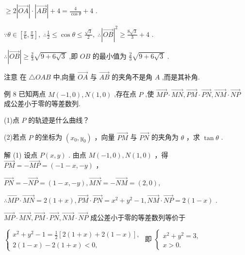 \documentclass[10pt]{article}
\begin{document}
\(\geq  2\left| \overrightarrow{OA}\right|  \cdot  \left| \overrightarrow{AB}\right|  + 4 = \frac{4}{\cos \theta } + 4\) .

\(\because \theta  \in  \left\lbrack  {\frac{\pi }{6},\frac{\pi }{3}}\right\rbrack  ,\;\therefore \frac{1}{2} \leq  \cos \theta  \leq  \frac{\sqrt{3}}{2},\;\therefore {\left| \overrightarrow{OB}\right| }^{2} \geq  \frac{8\sqrt{3}}{3} + 4\) .

\(\therefore \left| \overrightarrow{OB}\right|  \geq  \frac{2}{3}\sqrt{9 + 6\sqrt{3}}\) ,即 \({OB}\) 的最小值为 \(\frac{2}{3}\sqrt{9 + 6\sqrt{3}}\) .

注意 在 \(\bigtriangleup {OAB}\) 中,向量 \(\overrightarrow{OA}\) 与 \(\overrightarrow{AB}\) 的夹角不是角 \(A\) ,而是其补角.

例 8 已知两点 \(M\left( {-1,0}\right) ,N\left( {1,0}\right)\) ,存在点 \(P\) ,使 \(\overrightarrow{MP} \cdot  \overrightarrow{MN},\overrightarrow{PM} \cdot  \overrightarrow{PN},\overrightarrow{NM} \cdot  \overrightarrow{NP}\) 成公差小于零的等差数列.

(1)点 \(P\) 的轨迹是什么曲线？

(2)若点 \(P\) 的坐标为 \(\left( {{x}_{0},{y}_{0}}\right)\) ，向量 \(\overrightarrow{PM}\) 与 \(\overrightarrow{PN}\) 的夹角为 \(\theta\) ，求 \(\tan \theta\) .

解 (1) 设点 \(P\left( {x,y}\right)\) . 由点 \(M\left( {-1,0}\right) ,N\left( {1,0}\right)\) ，得 \(\overrightarrow{PM} =  - \overrightarrow{MP} = \left( {-1 - x, - y}\right)\) ，

\(\overrightarrow{PN} =  - \overrightarrow{NP} = \left( {1 - x, - y}\right) ,\overrightarrow{MN} =  - \overrightarrow{NM} = \left( {2,0}\right) ,\)

\(\therefore \overrightarrow{MP} \cdot  \overrightarrow{MN} = 2\left( {1 + x}\right) ,\overrightarrow{PM} \cdot  \overrightarrow{PN} = {x}^{2} + {y}^{2} - 1,\overrightarrow{NM} \cdot  \overrightarrow{NP} = 2\left( {1 - x}\right)\) .

\(\overrightarrow{MP} \cdot  \overrightarrow{MN},\overrightarrow{PM} \cdot  \overrightarrow{PN},\overrightarrow{NM} \cdot  \overrightarrow{NP}\) 成公差小于零的等差数列等价于

\(\left\{  \begin{array}{l} {x}^{2} + {y}^{2} - 1 = \frac{1}{2}\left\lbrack  {2\left( {1 + x}\right)  + 2\left( {1 - x}\right) }\right\rbrack  , \\  2\left( {1 - x}\right)  - 2\left( {1 + x}\right)  < 0, \end{array}\right.\) 即 \(\left\{  \begin{array}{l} {x}^{2} + {y}^{2} = 3, \\  x > 0. \end{array}\right.\)
\end{document}
